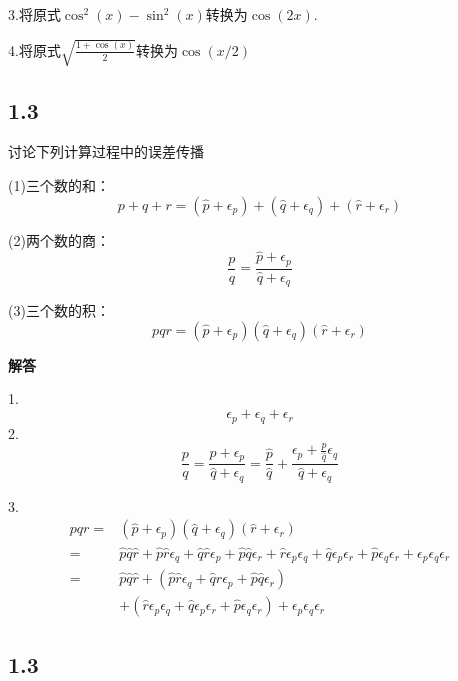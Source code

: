 3.将原式$\cos ^{2}(x)-\sin ^{2}(x)$转换为$\cos (2 x)$.

4.将原式$\sqrt{\frac{1+\cos (x)}{2}}$转换为$\cos (x / 2)$


\subsection{1.3}


讨论下列计算过程中的误差传播

(1)三个数的和：$$
p+q+r=\left(\widehat{p}+\epsilon_{p}\right)+\left(\widehat{q}+\epsilon_{q}\right)+\left(\widehat{r}+\epsilon_{r}\right)
$$

(2)两个数的商：$$\frac{p}{q}=\frac{\hat{p}+\epsilon_{p}}{\hat{q}+\epsilon_{q}}$$

(3)三个数的积：$$p q r=\left(\hat{p}+\epsilon_{p}\right)\left(\hat{q}+\epsilon_{q}\right)\left(\hat{r}+\epsilon_{r}\right)$$

\textbf{解答}

1.\begin{equation}\epsilon_{p}+\epsilon_{q}+\epsilon_{r}
\end{equation}
2.\begin{equation}
\frac{p}{q}=\frac{\hat{p}+\epsilon_{p}}{\hat{q}+\epsilon_{q}}=\frac{\hat{p}}{\hat{q}}+\frac{\epsilon_{p}+\frac{p}{\hat{q}} \epsilon_{q}}{\hat{q}+\epsilon_{q}}
\end{equation}


3.
\begin{equation}
\begin{aligned} p q r=&\left(\hat{p}+\epsilon_{p}\right)\left(\hat{q}+\epsilon_{q}\right)\left(\hat{r}+\epsilon_{r}\right) \\=& \hat{p} \hat{q} \hat{r}+\hat{p} \hat{r} \epsilon_{q}+\hat{q} \hat{r} \epsilon_{p}+\hat{p} \hat{q} \epsilon_{r}+\hat{r} \epsilon_{p} \epsilon_{q}+\hat{q} \epsilon_{p} \epsilon_{r}+\hat{p} \epsilon_{q} \epsilon_{r}+\epsilon_{p} \epsilon_{q} \epsilon_{r} \\=& \hat{p} \hat{q} \hat{r}+\left(\hat{p} \hat{r} \epsilon_{q}+\hat{q} \hat{r} \epsilon_{p}+\hat{p} \hat{q} \epsilon_{r}\right) \\ &+\left(\hat{r} \epsilon_{p} \epsilon_{q}+\hat{q} \epsilon_{p} \epsilon_{r}+\hat{p} \epsilon_{q} \epsilon_{r}\right)+\epsilon_{p} \epsilon_{q} \epsilon_{r} \end{aligned}
\end{equation}


\subsection{1.3}

